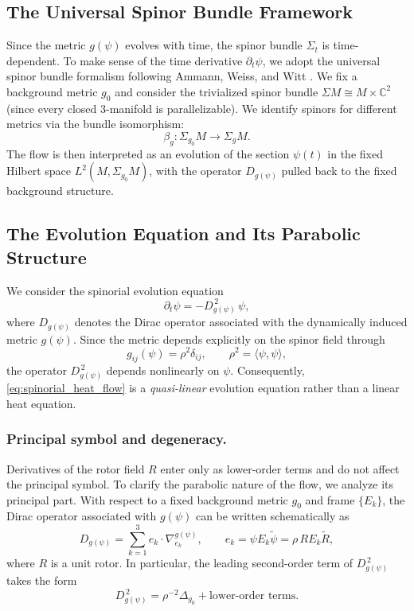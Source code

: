 \documentclass[11pt, reqno, a4paper]{amsart}
\theoremstyle{definition}
\theoremstyle{remark}
\begin{document}
\subsection{The Universal Spinor Bundle Framework}
Since the metric $g(\psi)$ evolves with time, the spinor bundle $\Sigma_t$ is time-dependent. To make sense of the time derivative $\partial_t \psi$, we adopt the universal spinor bundle formalism following Ammann, Weiss, and Witt \cite{ammann2012}.
We fix a background metric $g_0$ and consider the trivialized spinor bundle $\Sigma M \cong M \times \mathbb{C}^2$ (since every closed 3-manifold is parallelizable). We identify spinors for different metrics via the bundle isomorphism:
\begin{equation}
    \beta_{g}: \Sigma_{g_0} M \to \Sigma_{g} M.
\end{equation}
The flow is then interpreted as an evolution of the section $\psi(t)$ in the fixed Hilbert space $L^2(M, \Sigma_{g_0} M)$, with the operator $D_{g(\psi)}$ pulled back to the fixed background structure.

\subsection{The Evolution Equation and Its Parabolic Structure}

We consider the spinorial evolution equation
\begin{equation}
\partial_t \psi = - D_{g(\psi)}^{\,2}\, \psi ,
\label{eq:spinorial_heat_flow}
\end{equation}
where $D_{g(\psi)}$ denotes the Dirac operator associated with the dynamically induced
metric $g(\psi)$. Since the metric depends explicitly on the spinor field through
\[
g_{ij}(\psi) = \rho^2 \delta_{ij}, \qquad \rho^2 = \langle \psi , \psi \rangle ,
\]
the operator $D_{g(\psi)}^{\,2}$ depends nonlinearly on $\psi$. Consequently,
\eqref{eq:spinorial_heat_flow} is a \emph{quasi-linear} evolution equation rather than a linear
heat equation.

\subsubsection{Principal symbol and degeneracy.}
Derivatives of the rotor field \(R\) enter only as lower-order terms and do not affect the principal symbol. To clarify the parabolic nature of the flow, we analyze its principal part.
With respect to a fixed background metric $g_0$ and frame $\{E_k\}$, the Dirac operator
associated with $g(\psi)$ can be written schematically as
\[
D_{g(\psi)} = \sum_{k=1}^3 e_k \cdot \nabla^{g(\psi)}_{e_k},
\qquad
e_k = \psi E_k \tilde{\psi} = \rho\, R E_k \tilde{R},
\]
where $R$ is a unit rotor. In particular, the leading second-order term of
$D_{g(\psi)}^{\,2}$ takes the form
\begin{equation}
D_{g(\psi)}^{\,2}
= \rho^{-2} \Delta_{g_0} + \text{lower-order terms}.
\label{eq:principal_part}
\end{equation}
\end{document}
